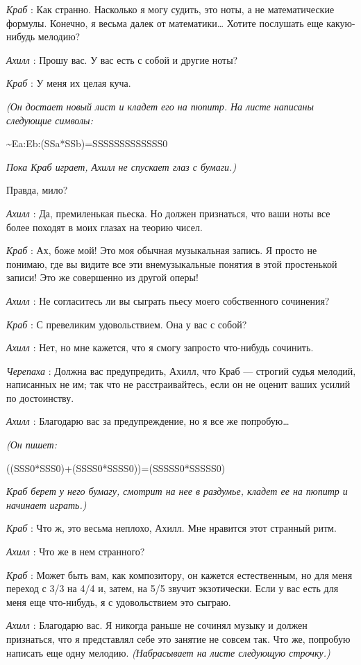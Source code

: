 \documentclass[../main.tex]{subfiles}
\begin{document}
\begin{dialogue}
\emph{Краб} : Как странно. Насколько я могу судить, это ноты, а не математические формулы. Конечно, я весьма далек от математики\ldots{} Хотите послушать еще какую-нибудь мелодию?

\emph{Ахилл} : Прошу вас. У вас есть с собой и другие ноты?

\emph{Краб} : У меня их целая куча.

\emph{(Он достает новый лист и кладет его на пюпитр. На листе написаны следующие символы:}

\textasciitilde Ea:Eb:(SSa*SSb)=SSSSSSSSSSSSS0

\emph{Пока Краб играет, Ахилл не спускает глаз с бумаги.)}

Правда, мило?

\emph{Ахилл} : Да, премиленькая пьеска. Но должен признаться, что ваши ноты все более походят в моих глазах на теорию чисел.

\emph{Краб} : Ах, боже мой! Это моя обычная музыкальная запись. Я просто не понимаю, где вы видите все эти внемузыкальные понятия в этой простенькой записи! Это же совершенно из другой оперы!

\emph{Ахилл} : Не согласитесь ли вы сыграть пьесу моего собственного сочинения?

\emph{Краб} : С превеликим удовольствием. Она у вас с собой?

\emph{Ахилл} : Нет, но мне кажется, что я смогу запросто что-нибудь сочинить.

\emph{Черепаха} : Должна вас предупредить, Ахилл, что Краб --- строгий судья мелодий, написанных не им; так что не расстраивайтесь, если он не оценит ваших усилий по достоинству.

\emph{Ахилл} : Благодарю вас за предупреждение, но я все же попробую\ldots{}

\emph{(Он пишет:}

((SSS0*SSS0)+(SSSS0*SSSS0))=(SSSSS0*SSSSS0)

\emph{Краб берет у него бумагу, смотрит на нее в раздумье, кладет ее на пюпитр и начинает играть.)}

\emph{Краб} : Что ж, это весьма неплохо, Ахилл. Мне нравится этот странный ритм.

\emph{Ахилл} : Что же в нем странного?

\emph{Краб} : Может быть вам, как композитору, он кажется естественным, но для меня переход с 3/3 на 4/4 и, затем, на 5/5 звучит экзотически. Если у вас есть для меня еще что-нибудь, я с удовольствием это сыграю.

\emph{Ахилл} : Благодарю вас. Я никогда раньше не сочинял музыку и должен признаться, что я представлял себе это занятие не совсем так. Что же, попробую написать еще одну мелодию. \emph{(Набрасывает на листе следующую строчку.)}


\end{dialogue}
\end{document}

